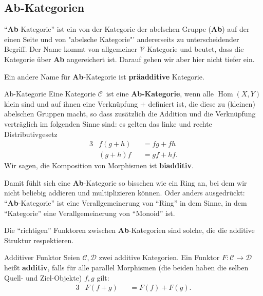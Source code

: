 \documentclass[a4paper]{amsart}
\theoremstyle{definition}
\DeclareMathOperator{\Hom}{Hom}
\newcommand{\CC}{\ensuremath{\mathcal{ C }}}
\newcommand{\DD}{\ensuremath{\mathcal{ D }}}
\begin{document}
\subsection{Ab-Kategorien}
"`\textbf{Ab}-Kategorie"' ist ein von der Kategorie der abelschen Gruppe (\textbf{Ab}) auf der einen Seite und von "abelsche Kategorie"' andererseits zu unterscheidender Begriff. Der Name kommt von allgemeiner $\mathcal{V}$-Kategorie und beutet, dass die Kategorie über \textbf{Ab} angereichert ist. Darauf gehen wir aber hier nicht tiefer ein.

Ein andere Name für \textbf{Ab}-Kategorie ist \textbf{präadditive} Kategorie. 

\begin{Definition}{Ab-Kategorie}
   Eine Kategorie \CC\ ist eine \textbf{Ab-Kategorie}, wenn alle $\Hom(X, Y)$ klein sind und auf ihnen eine Verknüpfung $+$ definiert ist, die diese zu (kleinen) abelschen Gruppen macht, so dass zusätzlich die Addition und die Verknüpfung verträglich im folgenden Sinne sind: es gelten das linke und rechte Distributivgesetz
   \begin{alignat}{3}
      &f(g+h) &&= fg+fh\\
      &(g+h)f &&= gf+hf.
   \end{alignat}
   Wir sagen, die Komposition von Morphismen ist \textbf{biadditiv}.
\end{Definition}
Damit fühlt sich eine \textbf{Ab}-Kategorie so bisschen wie ein Ring an, bei dem wir nicht beliebig addieren und multiplizieren können. Oder anders ausgedrückt: "`\textbf{Ab}-Kategorie"' ist eine Verallgemeinerung von "`Ring"' in dem Sinne, in dem "`Kategorie"' eine Verallgemeinerung von "`Monoid"' ist.

Die "`richtigen"' Funktoren zwischen \textbf{Ab}-Kategorien sind solche, die die additive Struktur respektieren.
\begin{Definition}{Additiver Funktor}
   Seien $\CC, \DD$ zwei additive Kategorien. Ein Funktor $F \colon \CC \to \DD$ heißt \textbf{additiv}, falls für alle parallel Morphismen (die beiden haben die selben Quell- und Ziel-Objekte) $f,g$ gilt:
   \begin{alignat}{3}
      &F(f+g) &&= F(f)+F(g).
   \end{alignat}
\end{Definition}
\end{document}
